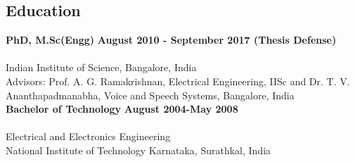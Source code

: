 \documentclass[line]{resume}
\begin{document}
{\begin{resume}
	
	
			\section{\mysidestyle Education}
			\vspace{1mm}
			\textbf{PhD, M.Sc(Engg)} \hfill \textbf{ August 2010 - September 2017 (Thesis Defense)}\vspace{-3mm}\\\vspace{-1mm}\\%
			Indian Institute of Science, Bangalore, India \vspace{0mm}\\%
			Advisors: Prof. A. G. Ramakrishnan, Electrical Engineering, IISc and Dr. T. V. Ananthapadmanabha, Voice and Speech Systems, Bangalore, India\vspace{-6mm}\\
			
			\textbf{Bachelor of Technology} \hfill \textbf{ August 2004-May 2008}\vspace{-3mm}\\\vspace{-1mm}\\%
			 Electrical and Electronics Engineering\\
			National Institute of Technology Karnataka, Surathkal, India \vspace{0mm}\\%
			
			
			\vspace{-1.5mm}


\end{resume}}
\end{document}
